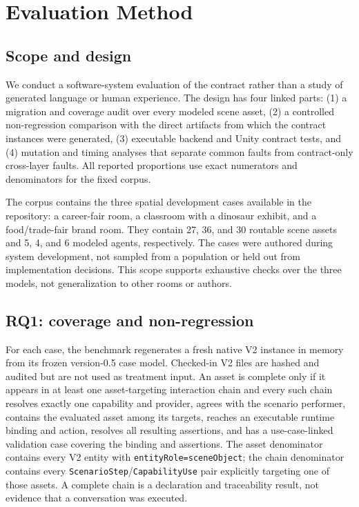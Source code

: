 \section{Evaluation Method}
\label{sec:evaluation}

\subsection{Scope and design}

We conduct a software-system evaluation of the contract rather than a study of
generated language or human experience.  The design has four linked parts:
(1) a migration and coverage audit over every modeled scene asset, (2) a
controlled non-regression comparison with the direct artifacts from which the
contract instances were generated, (3) executable backend and Unity contract
tests, and (4) mutation and timing analyses that separate common faults from
contract-only cross-layer faults.  All reported proportions use exact
numerators and denominators for the fixed corpus.

The corpus contains the three spatial development cases available in the
repository: a career-fair room, a classroom with a dinosaur exhibit, and a
food/trade-fair brand room.  They contain 27, 36, and 30 routable scene assets
and 5, 4, and 6 modeled agents, respectively.  The cases were authored during
system development, not sampled from a population or held out from
implementation decisions.  This scope supports exhaustive checks over the
three models, not generalization to other rooms or authors.

\subsection{RQ1: coverage and non-regression}

For each case, the benchmark regenerates a fresh native V2 instance in memory
from its frozen version-0.5 case model.  Checked-in V2 files are hashed and
audited but are not used as treatment input.  An asset is complete only if it
appears in at least one asset-targeting interaction chain and every such chain
resolves exactly one capability and provider, agrees with the scenario
performer, contains the evaluated asset among its targets, reaches an
executable runtime binding and action, resolves all resulting assertions, and
has a use-case-linked validation case covering the binding and assertions.
The asset denominator contains every V2 entity with
\texttt{entityRole=sceneObject}; the chain denominator contains every
\texttt{ScenarioStep}/\texttt{CapabilityUse} pair explicitly targeting one of
those assets.  A complete chain is a declaration and traceability result, not
evidence that a conversation was executed.

